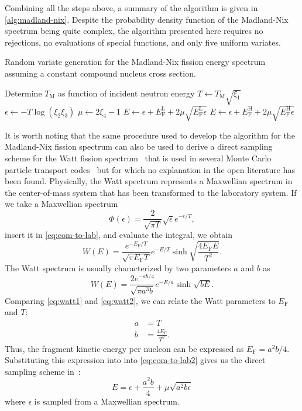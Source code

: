 \documentclass[3p,fleqn]{elsarticle}
\newcommand{\tmax}{T_{\mathrm{M}}}
\newcommand{\ef}{E_{\mathrm{F}}}
\newcommand{\efl}{E_{\mathrm{F}}^{\mathrm{L}}}
\newcommand{\efh}{E_{\mathrm{F}}^{\mathrm{H}}}
\begin{document}
Combining all the steps above, a summary of the algorithm is given in
\autoref{alg:madland-nix}. Despite the probability density function of the
Madland-Nix spectrum being quite complex, the algorithm presented here requires
no rejections, no evaluations of special functions, and only five uniform
variates.
\begin{algorithm}
  \caption{Random variate generation for the Madland-Nix fission energy spectrum
    assuming a constant compound nucleus cross section.}
  \label{alg:madland-nix}
  \begin{algorithmic}[1]
    \State Determine $\tmax$ as function of incident neutron energy
    \State $T \gets \tmax \sqrt{\xi_1}$
    \State $\epsilon \gets - T \log(\xi_2 \xi_3)$
    \State $\mu \gets 2\xi_4 - 1$
      \State $E \gets \epsilon + \efl + 2\mu \sqrt{\efl \epsilon}$
    \Else
      \State $E \gets \epsilon + \efh + 2\mu \sqrt{\efh \epsilon}$
    \EndIf
  \end{algorithmic}
\end{algorithm}

It is worth noting that the same procedure used to develop the algorithm for the
Madland-Nix fission spectrum can also be used to derive a direct sampling scheme
for the Watt fission spectrum~\cite{lanl-brown-2005} that is used in several
Monte Carlo particle transport codes~\cite{snamc-griesheimer-2013,
  ane-romano-2013} but for which no explanation in the open literature has been
found. Physically, the Watt spectrum represents a Maxwellian spectrum in the
center-of-mass system that has been transformed to the laboratory system. If we
take a Maxwellian spectrum
\begin{equation*}
  \Phi(\epsilon) = \frac{2}{\sqrt{\pi T}} \sqrt{\epsilon} e^{-\epsilon/T},
\end{equation*}
insert it in \autoref{eq:com-to-lab}, and evaluate the integral, we obtain
\begin{equation}
  W(E) = \frac{e^{-\ef/T}}{\sqrt{\pi \ef T}} e^{-E/T} \sinh \sqrt{\frac{4\ef
      E}{T^2}}.
  \label{eq:watt1}
\end{equation}
The Watt spectrum is usually characterized by two parameters $a$ and $b$ as
\begin{equation}
  W(E) = \frac{2e^{-ab/4}}{\sqrt{\pi a^3 b}} e^{-E/a} \sinh \sqrt{bE}.
  \label{eq:watt2}
\end{equation}
Comparing \autoref{eq:watt1} and \autoref{eq:watt2}, we can relate the Watt
parameters to $\ef$ and $T$:
\begin{align*}
  a &= T \\
  b &= \frac{4\ef}{T^2}.
\end{align*}
Thus, the fragment kinetic energy per nucleon can be expressed as $\ef =
a^2b/4$. Substituting this expression into into \autoref{eq:com-to-lab2} gives us
the direct sampling scheme in~\cite{lanl-brown-2005}:
\begin{equation*}
  E = \epsilon + \frac{a^2b}{4} + \mu \sqrt{a^2 b \epsilon}
\end{equation*}
where $\epsilon$ is sampled from a Maxwellian spectrum.
\end{document}
